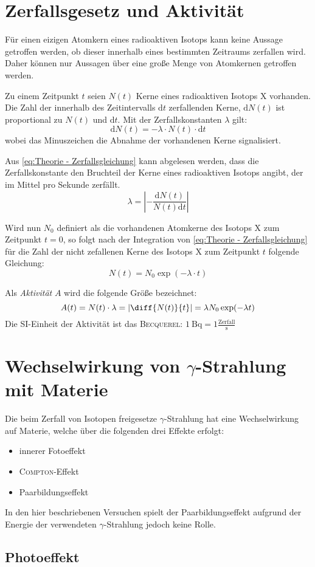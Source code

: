 \documentclass[../protokoll.tex]{subfiles}
\begin{document}
\section{Zerfallsgesetz und Aktivität}
Für einen eizigen Atomkern eines radioaktiven Isotops kann keine Aussage
getroffen werden, ob dieser innerhalb eines bestimmten Zeitraums zerfallen wird.
Daher können nur Aussagen über eine große Menge von Atomkernen getroffen werden.

Zu einem Zeitpunkt $t$ seien $N(t)$ Kerne eines radioaktiven Isotops X 
vorhanden. Die Zahl der innerhalb des Zeitintervalls $\mathrm{d}t$ zerfallenden
Kerne, $\mathrm{d}N(t)$ ist proportional zu $N(t)$ und $\mathrm{d}t$. Mit der
Zerfallskonstanten $\lambda$ gilt:
\begin{equation}\label{eq:Theorie - Zerfallsgleichung}
    \mathrm{d}N(t) = - \lambda \cdot N(t) \cdot \mathrm{d}t
\end{equation}
wobei das Minuszeichen die Abnahme der vorhandenen Kerne signalisiert.

Aus \cref{eq:Theorie - Zerfallsgleichung} kann abgelesen werden, dass die
Zerfallskonstante den Bruchteil der Kerne eines radioaktiven Isotops angibt, der
im Mittel pro Sekunde zerfällt.
\begin{equation}\label{eq:Zerfallskonstante}
    \lambda = \left| - \dfrac{\mathrm{d}N(t)}{N(t) \mathrm{d}t} \right|
\end{equation}

Wird nun $N_0$ definiert als die vorhandenen Atomkerne des Isotops X zum 
Zeitpunkt $t=0$, so folgt nach der Integration von 
\cref{eq:Theorie - Zerfallsgleichung} für die Zahl der nicht zefallenen Kerne
des Isotops X zum Zeitpunkt $t$ folgende Gleichung:
\begin{equation}\label{eq:Vorhandene Kerne}
    N(t) = N_0 \exp(-\lambda \cdot t)
\end{equation}

Als \textsl{Aktivität} $A$ wird die folgende Größe bezeichnet:
\begin{equation}\label{eq:Aktivität}
    A(t) = N(t) \cdot \lambda = \left| \diff{N(t)}{t} \right| = \lambda N_0 \exp(- \lambda t)
\end{equation}
Die SI-Einheit der Aktivität ist das \textsc{Becquerel}: $\qty{1}{\becquerel} = 1 \frac{\text{Zerfall}}{\unit{\second}}$
\newpage


\section{Wechselwirkung von \texorpdfstring{$\gamma$}{Gamma}-Strahlung mit Materie}
Die beim Zerfall von Isotopen freigesetze $\gamma$-Strahlung hat eine
Wechselwirkung auf Materie, welche über die folgenden drei Effekte erfolgt:
\begin{itemize}[noitemsep,nosep]
    \item innerer Fotoeffekt
    \item \textsc{Compton}-Effekt
    \item Paarbildungseffekt
\end{itemize}

In den hier beschriebenen Versuchen spielt der Paarbildungseffekt aufgrund der
Energie der verwendeten $\gamma$-Strahlung jedoch keine Rolle.

\subsection{Photoeffekt}
\end{document}
